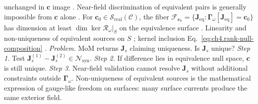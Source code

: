 unchanged in \(\mathbf{c}\) image . Near-field discrimination of equivalent pairs is generally
impossible from \(\mathbf{c}\) alone .
\label{thm:ch4.equivalence-fiber}
For \(\mathbf{c}_{0}\in\mathcal{S}_{\mathrm{real}}(\mathcal{C})\), the fiber
\(\mathcal{F}_{\mathbf{c}_{0}}=\{\mathbf{J}_{\mathrm{eq}}:\boldsymbol{\Gamma}_\omega[\mathbf{J}_{\mathrm{eq}}]=\mathbf{c}_{0}\}\)
has dimension at least \(\dim\ker\mathcal{R}_\omega|_{S}\) on the equivalence surface .
Linearity and non-uniqueness of equivalent sources on \(S\) ; kernel inclusion
Eq.~\eqref{eq:ch4.rank-null-composition} .
\emph{Problem.} MoM returns \(\mathbf{J}_{s}\) claiming uniqueness. Is \(\mathbf{J}_{s}\) unique?
\emph{Step 1.} Test \(\mathbf{J}_{s}^{(1)}-\mathbf{J}_{s}^{(2)}\in\mathcal{N}_{\mathrm{syn}}\).
\emph{Step 2.} If difference lies in equivalence null space, \(\mathbf{c}\) is still unique.
\emph{Step 3.} Near-field validation cannot resolve \(\mathbf{J}_{s}\) without additional constraints outside
\(\boldsymbol{\Gamma}_\omega\).
Non-uniqueness of equivalent sources is the mathematical expression of gauge-like freedom on surfaces: many surface currents produce the same exterior field.
